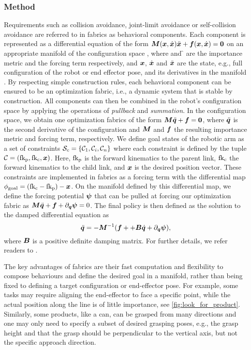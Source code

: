 \subsubsection{Method}
Requirements such as collision avoidance, joint-limit avoidance or self-collision avoidance are referred to in fabrics as behavioral components. Each component is represented as a differential equation of the form
$\bm{M}(\bm{x},\dot{\bm{x}})\ddot{\bm{x}}+\bm{f}(\bm{x},\dot{\bm{x}})=\bm{0}$ on an appropriate
manifold \X{} of the configuration space \Q{}, where \M{} and \f{} are the importance metric and the forcing term respectively, and $\bm{x}$, $\dot{\bm{x}}$ and $\ddot{\bm{x}}$ are the state, e.g., full configuration of the robot or end effector pose, and its derivatives in the manifold \X{}.
By respecting
simple construction rules, each behavioral component can be ensured to
be an optimization fabric, i.e., a dynamic system that is
stable by construction. All components can then be combined
in the robot's configuration space by applying the
operations of \textit{pullback} and \textit{summation}. In
the configuration space, we obtain one optimization fabrics
of the form $\bm{M}\ddot{\bm{q}} + \bm{f} = \bm{0}$, where $\ddot{\bm{q}}$ is the second derivative of the configuration and $\bm{M}$ and $\bm{f}$ the resulting importance metric and forcing term, respectively.
We define goal states of the robotic arm as a set of
constraints $\mathcal{S}_c = \{\mathcal{C}_1,\mathcal{C}_i,\mathcal{C}_n\}$ where each
constraint \Con{} is defined by the tuple
$\mathcal{C}=(\textrm{fk}_{\textrm{p}},\textrm{fk}_{\textrm{c}},\bm{x})$. Here, $\textrm{fk}_{\textrm{p}}$ is the forward
kinematics to the parent link, $\textrm{fk}_{\textrm{c}}$ the forward
kinematics to the child link, and $\bm{x}$ is the desired position
vector. These constraints are implemented in \ac{fabrics} as a forcing term with the
differential map $\phi_{\textrm{goal}} = (\textrm{fk}_{\textrm{c}} - \textrm{fk}_{\textrm{p}}) -
\bm{x}$. On the manifold defined by this differential map, we
define the forcing potential $\bm{\psi}$ that can be pulled at
forcing our optimization fabric as
$\bm{M}\ddot{\bm{q}}+\bm{f}+\partial_{\bm{q}}\bm{\psi} = 0$.
The final policy is then defined as the solution to the
damped differential equation as
\begin{equation}
  \ddot{\bm{q}} = -\bm{M}^{-1}(\bm{f} + + \bm{B}\dot{\bm{q}} + \partial_{\bm{q}}\bm{\psi}),
  \label{eq:fabrics_policy}
\end{equation}
where $\bm{B}$ is a positive definite damping matrix.
For further details, we refer readers to \cite{Spahn2023}.

The key advantages of \ac{fabrics} are their fast computation and flexibility to
compose behaviours and define the desired goal in a manifold, rather than being
fixed to defining a target configuration or end-effector pose. For
example, some tasks may require aligning the end-effector
to face a specific point, while
the actual position along the line is of little importance, see
\cref{fig:look_for_product}.
Similarly, some products, like a can, can be grasped from many directions and one may only need to specify a subset of desired grasping poses, e.g., the grasp height and that the grasp should be perpendicular to the vertical axis, but not the specific approach direction.



